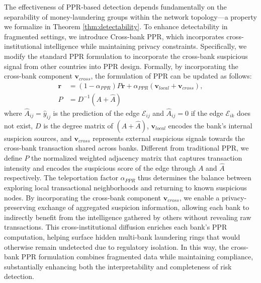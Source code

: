 \documentclass[11pt,english]{article}
\renewcommand{\hat}{\widehat}
\begin{document}
The effectiveness of PPR-based detection depends fundamentally on the separability of money-laundering groups within the network topology—a property we formalize in Theorem \ref{thm:detectability}. To enhance detectability in fragmented settings, we introduce Cross-bank PPR, which incorporates cross-institutional intelligence while maintaining privacy constraints. Specifically, we modify the standard PPR formulation to incorporate the cross-bank suspicious signal from other countries into PPR design. 
Formally, by incorporating the cross-bank component $\boldsymbol{v}_{cross}$, the formulation of PPR can be updated as follows:
\begin{align}
    \boldsymbol{r} &= (1 - \alpha_{PPR})P \boldsymbol{r} + \alpha_{PPR} (\boldsymbol{v}_{local} + \label{PPR_weight} \boldsymbol{v}_{cross}), \\
    P &= D^{-1}(A + \hat{A})  
\label{eq:ppr}
\end{align}
where $\hat{A}_{ij}=\hat{y}_{ij}$ is the prediction of the edge $\mathcal{E}_{ij}$ and $\hat{A}_{ij}=0$ if the edge $\mathcal{E}_{ik}$ does not exist, $D$ is the degree matrix of $(A + \hat{A})$,  $\boldsymbol{v}_{local}$ encodes the bank’s internal suspicion sources, and $\boldsymbol{v}_{cross}$ represents external suspicious signals towards the cross-bank transaction shared across banks. Different from traditional PPR, we define $P$ the normalized weighted adjacency matrix that captures transaction intensity and encodes the suspicious score of the edge through $A$ and $\hat{A}$ respectively.
The teleportation factor $\alpha_{PPR}$ thus determines the balance between exploring local transactional neighborhoods and returning to known suspicious nodes. By incorporating the cross-bank component $\boldsymbol{v}_{cross}$, we enable a privacy-preserving exchange of aggregated suspicion information, allowing each bank to indirectly benefit from the intelligence gathered by others without revealing raw transactions. This cross-institutional diffusion enriches each bank’s PPR computation, helping surface hidden multi-bank laundering rings that would otherwise remain undetected due to regulatory isolation. In this way, the cross-bank PPR formulation combines fragmented data while maintaining compliance, substantially enhancing both the interpretability and completeness of risk detection.
\end{document}
